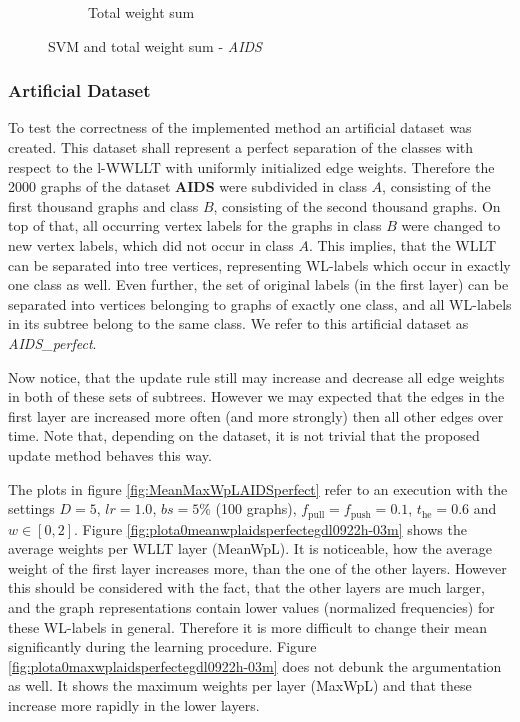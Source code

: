 \begin{figure}[H]
\begin{subfigure}{0.45\textwidth}
				\caption{Total weight sum}
				\label{fig:plota2totalweightsumaidsgdl2417h-05}
			\end{subfigure}
			\caption{SVM and total weight sum - \textit{AIDS}}
			\label{fig:SVMTotalWS_AIDS}
		\end{figure}	
	
	\subsubsection{Artificial Dataset} \label{subsubsec:exp_AIDS_perfect}
		
		To test the correctness of the implemented method an artificial dataset was created.
		This dataset shall represent a perfect separation of the classes with respect to the l-WWLLT with uniformly initialized edge weights.
		Therefore the 2000 graphs of the dataset \textbf{AIDS} were subdivided in class $A$, consisting of the first thousand graphs and class $B$, consisting of the second thousand graphs.
		On top of that, all occurring vertex labels for the graphs in class $B$ were changed to new vertex labels, which did not occur in class $A$.
		This implies, that the WLLT can be separated into tree vertices, representing WL-labels which occur in exactly one class as well.
		Even further, the set of original labels (in the first layer) can be separated into vertices belonging to graphs of exactly one class, and all WL-labels in its subtree belong to the same class.
		We refer to this artificial dataset as \textit{AIDS\_perfect}.
		
		Now notice, that the update rule still may increase and decrease all edge weights in both of these sets of subtrees.
		However we may expected that the edges in the first layer are increased more often (and more strongly) then all other edges over time.
		Note that, depending on the dataset, it is not trivial that the proposed update method behaves this way.

		The plots in figure \ref{fig:MeanMaxWpLAIDSperfect} refer to an execution with the settings $D=5$, $lr=1.0$, $bs=5\%$ (100 graphs), $f_{\text{pull}}=f_{\text{push}}=0.1$, $t_{\text{he}}=0.6$ and $w\in[0,2]$.
		Figure \ref{fig:plota0meanwplaidsperfectegdl0922h-03m} shows the average weights per WLLT layer (MeanWpL). 
		It is noticeable, how the average weight of the first layer increases more, than the one of the other layers.
		However this should be considered with the fact, that the other layers are much larger, and the graph representations contain lower values (normalized frequencies) for these WL-labels in general.
		Therefore it is more difficult to change their mean significantly during the learning procedure.
		Figure \ref{fig:plota0maxwplaidsperfectegdl0922h-03m} does not debunk the argumentation as well.
		It shows the maximum weights per layer (MaxWpL) and that these increase more rapidly in the lower layers.
				
